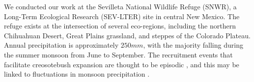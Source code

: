 \documentclass[11pt]{article}\usepackage[]{graphicx}\usepackage[usenames,dvipsnames]{xcolor}
\begin{document}
We conducted our work at the Sevilleta National Wildlife Refuge (SNWR), a Long-Term Ecological Research (SEV-LTER) site in central New Mexico.
The refuge exists at the intersection of several eco-regions, including the northern Chihuahuan Desert, Great Plains grassland, and steppes of the Colorado Plateau.
Annual precipitation is approximately $250 mm$, with the majority falling during the summer monsoon from June to September.
The recruitment events that facilitate creosotebush expansion are thought to be episodic \citep{peters2012long}, and this may be linked to fluctuations in monsoon precipitation \citep{boyd1983postdispersal, bowers2004temporal}.

\end{document}
